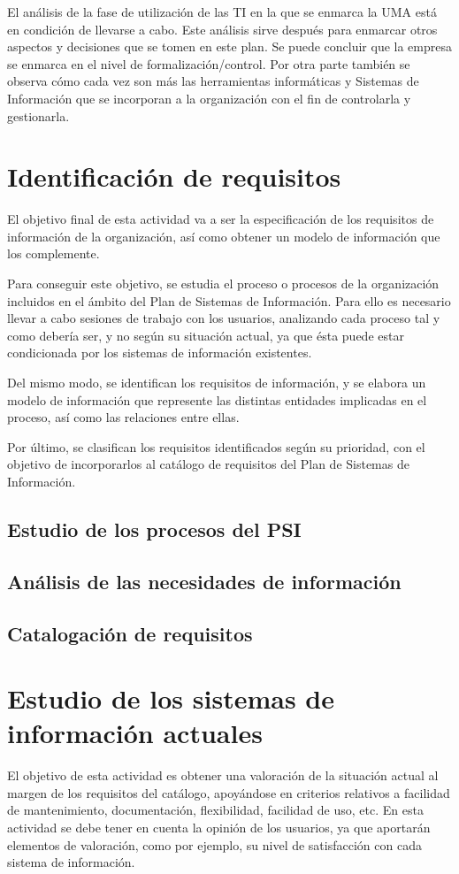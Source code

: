 \documentclass[12pt,a4paper,spanish,twoside]{book}
\begin{document}
\begin{enumerate}
\begin{itemize}
El análisis de la fase de utilización de las TI en la que se enmarca la 
UMA está en condición de llevarse a cabo. Este análisis sirve después
para enmarcar otros aspectos y decisiones que se tomen en este plan. Se puede
concluir que la empresa se enmarca en el nivel de formalización/control. Por
otra parte también se observa cómo cada vez son más las herramientas
informáticas y Sistemas de Información que se incorporan a la organización
con el fin de controlarla y gestionarla. 

\chapter{Identificación de requisitos}
El objetivo final de esta actividad va a ser la especificación de los
requisitos de información de la organización, así como obtener un modelo de
información que los complemente.

Para conseguir este objetivo, se estudia el proceso o procesos de la
organización incluidos en el ámbito del Plan de Sistemas de Información. Para
ello es necesario llevar a cabo sesiones de trabajo con los usuarios,
analizando cada proceso tal y como debería ser, y no según su situación
actual, ya que ésta puede estar condicionada por los sistemas de información
existentes. 

Del mismo modo, se identifican los requisitos de información, y
se elabora un modelo de información que represente las distintas entidades
implicadas en el proceso, así como las relaciones entre ellas. 

Por último, se clasifican los requisitos identificados según su prioridad,
con el objetivo de incorporarlos al catálogo de requisitos del Plan de
Sistemas de Información. 

\section{Estudio de los procesos del PSI}


\section{Análisis de las necesidades de información}

\section{Catalogación de requisitos}


\chapter{Estudio de los sistemas de información actuales}
El objetivo de esta actividad es obtener una valoración de la situación
actual al margen de los requisitos del catálogo, apoyándose en criterios
relativos a facilidad de mantenimiento, documentación, flexibilidad,
facilidad de uso, etc. En esta actividad se debe tener en cuenta la opinión
de los usuarios, ya que aportarán elementos de valoración, como por ejemplo,
su nivel de satisfacción con cada sistema de información. 


\end{itemize}
\end{enumerate}
\end{document}
